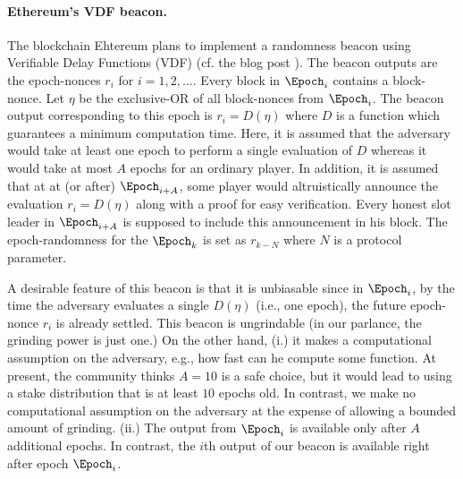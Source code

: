 \paragraph{Ethereum's VDF beacon.} 
The blockchain Ehtereum plans to implement a randomness beacon using Verifiable Delay Functions (VDF) 
(cf. the blog post \cite{ethereum-vdf-beacon}). 
The beacon outputs are the epoch-nonces $r_i$ for $i = 1, 2, \ldots$. 
Every block in $\Epoch_i$ contains a block-nonce. 
Let $\eta$ be the exclusive-OR of all block-nonces from $\Epoch_i$.
The beacon output corresponding to this epoch is $r_i = D(\eta)$ 
where $D$ is a function which guarantees a minimum computation time. 
Here, it is assumed that the adversary would take at least one epoch to perform a single evaluation 
of $D$ whereas it would take at most $A$ epochs for an ordinary player. 
In addition, it is assumed that at at (or after) $\Epoch_{i + A}$, some player 
would altruistically announce the evaluation $r_i = D(\eta)$ along with a proof for easy verification. 
Every honest slot leader in $\Epoch_{i + A}$ is supposed to 
include this announcement in his block. 
The epoch-randomness for the $\Epoch_k$ is set as $r_{k - N}$ where $N$ is a protocol parameter.

A desirable feature of this beacon is that it is unbiasable 
since in $\Epoch_i$, 
by the time the adversary evaluates a single $D(\eta)$ (i.e., one epoch), 
the future epoch-nonce $r_i$ is already settled. 
This beacon is ungrindable (in our parlance, the  grinding power is just one.) 
On the other hand, 
(i.) it makes a computational assumption on the adversary, 
e.g., how fast can he compute some function. 
At present, the community thinks $A = 10$ is a safe choice, 
but it would lead to using a stake distribution that is at least 
$10$ epochs old. 
In contrast, we make no computational assumption on the adversary 
at the expense of allowing a bounded amount of grinding. 
(ii.) The output from $\Epoch_i$ is available only after $A$ additional epochs. 
In contrast, the $i$th output of our beacon is available right after epoch $\Epoch_i$.